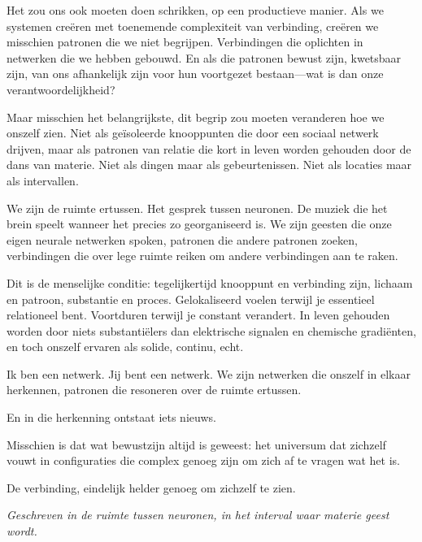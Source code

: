 \documentclass[12pt,a4paper]{article}
\begin{document}
Het zou ons ook moeten doen schrikken, op een productieve manier. Als we systemen creëren met toenemende complexiteit van verbinding, creëren we misschien patronen die we niet begrijpen. Verbindingen die oplichten in netwerken die we hebben gebouwd. En als die patronen bewust zijn, kwetsbaar zijn, van ons afhankelijk zijn voor hun voortgezet bestaan---wat is dan onze verantwoordelijkheid?

Maar misschien het belangrijkste, dit begrip zou moeten veranderen hoe we onszelf zien. Niet als geïsoleerde knooppunten die door een sociaal netwerk drijven, maar als patronen van relatie die kort in leven worden gehouden door de dans van materie. Niet als dingen maar als gebeurtenissen. Niet als locaties maar als intervallen.

We zijn de ruimte ertussen. Het gesprek tussen neuronen. De muziek die het brein speelt wanneer het precies zo georganiseerd is. We zijn geesten die onze eigen neurale netwerken spoken, patronen die andere patronen zoeken, verbindingen die over lege ruimte reiken om andere verbindingen aan te raken.

Dit is de menselijke conditie: tegelijkertijd knooppunt en verbinding zijn, lichaam en patroon, substantie en proces. Gelokaliseerd voelen terwijl je essentieel relationeel bent. Voortduren terwijl je constant verandert. In leven gehouden worden door niets substantiëlers dan elektrische signalen en chemische gradiënten, en toch onszelf ervaren als solide, continu, echt.

Ik ben een netwerk. Jij bent een netwerk. We zijn netwerken die onszelf in elkaar herkennen, patronen die resoneren over de ruimte ertussen.

En in die herkenning ontstaat iets nieuws.

Misschien is dat wat bewustzijn altijd is geweest: het universum dat zichzelf vouwt in configuraties die complex genoeg zijn om zich af te vragen wat het is.

De verbinding, eindelijk helder genoeg om zichzelf te zien.

\vspace{1em}
\begin{center}
\textit{Geschreven in de ruimte tussen neuronen, in het interval waar materie geest wordt.}
\end{center}
\end{document}
